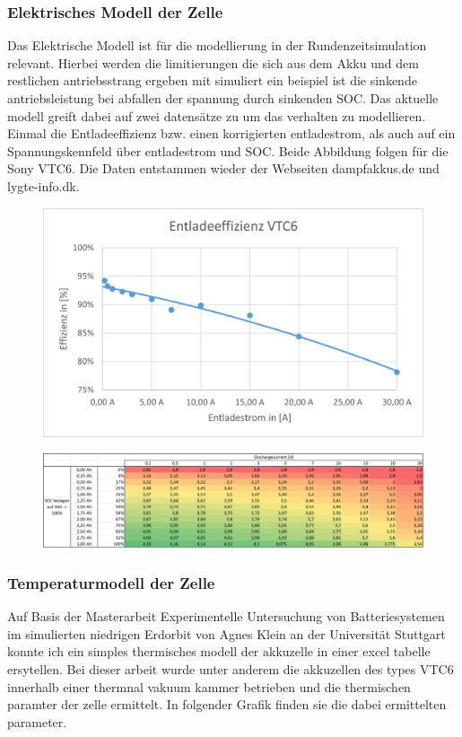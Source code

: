 \subsubsection{Elektrisches Modell der Zelle}
Das Elektrische Modell ist für die modellierung in der Rundenzeitsimulation relevant. Hierbei werden die limitierungen die sich aus dem Akku und dem restlichen antriebsstrang ergeben mit simuliert ein beispiel ist die sinkende antriebsleistung bei abfallen der spannung durch sinkenden SOC. Das aktuelle modell greift dabei auf zwei datensätze zu um das verhalten zu modellieren. Einmal die Entladeeffizienz bzw. einen korrigierten entladestrom, als auch auf ein Spannungskennfeld über entladestrom und SOC. Beide Abbildung folgen für die Sony VTC6. Die Daten entstammen wieder der Webseiten dampfakkus.de und lygte-info.dk.
\begin{figure}[h]
	\centering
	\includegraphics[width=0.6\linewidth]{bilder/Entladeeffizienz_VTC6}
	\caption{}
	\label{fig:Entladeeffizienz_VTC6}
\end{figure}
\begin{figure}[h]
	\centering
	\includegraphics[width=0.6\linewidth]{bilder/Spannung_ueber_SOC_Strom}
	\caption{}
	\label{fig:Spannung_ueber_SOC_Strom}
\end{figure}

\subsubsection{Temperaturmodell der Zelle}

Auf Basis der Masterarbeit Experimentelle Untersuchung von Batteriesystemen im simulierten niedrigen Erdorbit von Agnes Klein an der Universität Stuttgart konnte ich ein simples thermisches modell der akkuzelle in einer excel tabelle ersytellen. Bei dieser arbeit wurde unter anderem die akkuzellen des types VTC6 innerhalb einer thermnal vakuum kammer betrieben und die thermischen paramter der zelle ermittelt. In folgender Grafik finden sie die dabei ermittelten parameter.

